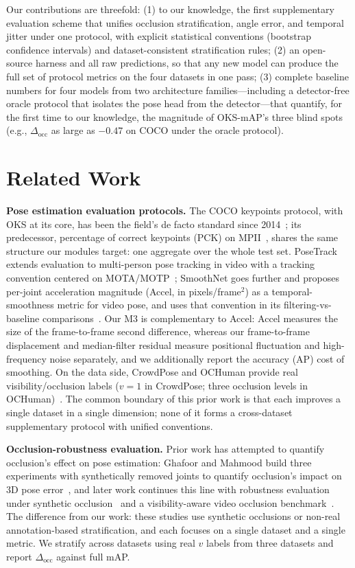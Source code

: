 \documentclass[10pt,conference]{IEEEtran}
\begin{document}
Our contributions are threefold: (1) to our knowledge, the first supplementary evaluation scheme that unifies occlusion stratification, angle error, and temporal jitter under one protocol, with explicit statistical conventions (bootstrap confidence intervals) and dataset-consistent stratification rules; (2) an open-source harness and all raw predictions, so that any new model can produce the full set of protocol metrics on the four datasets in one pass; (3) complete baseline numbers for four models from two architecture families---including a detector-free oracle protocol that isolates the pose head from the detector---that quantify, for the first time to our knowledge, the magnitude of OKS-mAP's three blind spots (e.g., $\Delta_{\mathrm{occ}}$ as large as $-0.47$ on COCO under the oracle protocol).

\section{Related Work}

\textbf{Pose estimation evaluation protocols.} The COCO keypoints protocol, with OKS at its core, has been the field's de facto standard since 2014~\cite{1}; its predecessor, percentage of correct keypoints (PCK) on MPII~\cite{16}, shares the same structure our modules target: one aggregate over the whole test set. PoseTrack extends evaluation to multi-person pose tracking in video with a tracking convention centered on MOTA/MOTP~\cite{3}; SmoothNet goes further and proposes per-joint acceleration magnitude (Accel, in pixels/frame$^2$) as a temporal-smoothness metric for video pose, and uses that convention in its filtering-vs-baseline comparisons~\cite{15}. Our M3 is complementary to Accel: Accel measures the size of the frame-to-frame second difference, whereas our frame-to-frame displacement and median-filter residual measure positional fluctuation and high-frequency noise separately, and we additionally report the accuracy (AP) cost of smoothing. On the data side, CrowdPose and OCHuman provide real visibility/occlusion labels ($v{=}1$ in CrowdPose; three occlusion levels in OCHuman)~\cite{2,7}. The common boundary of this prior work is that each improves a single dataset in a single dimension; none of it forms a cross-dataset supplementary protocol with unified conventions.

\textbf{Occlusion-robustness evaluation.} Prior work has attempted to quantify occlusion's effect on pose estimation: Ghafoor and Mahmood build three experiments with synthetically removed joints to quantify occlusion's impact on 3D pose error~\cite{8}, and later work continues this line with robustness evaluation under synthetic occlusion~\cite{9} and a visibility-aware video occlusion benchmark~\cite{10}. The difference from our work: these studies use synthetic occlusions or non-real annotation-based stratification, and each focuses on a single dataset and a single metric. We stratify across datasets using real $v$ labels from three datasets and report $\Delta_{\mathrm{occ}}$ against full mAP.
\end{document}
